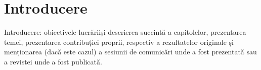 \chapter{Introducere}

\label{intro}

\par Introducere: obiectivele lucrăriiși descrierea succintă a capitolelor, prezentarea temei, prezentarea contribuției proprii, respectiv a rezultatelor originale și menționarea (dacă este cazul) a sesiunii de comunicări unde a fost prezentată sau a revistei unde a fost publicată.